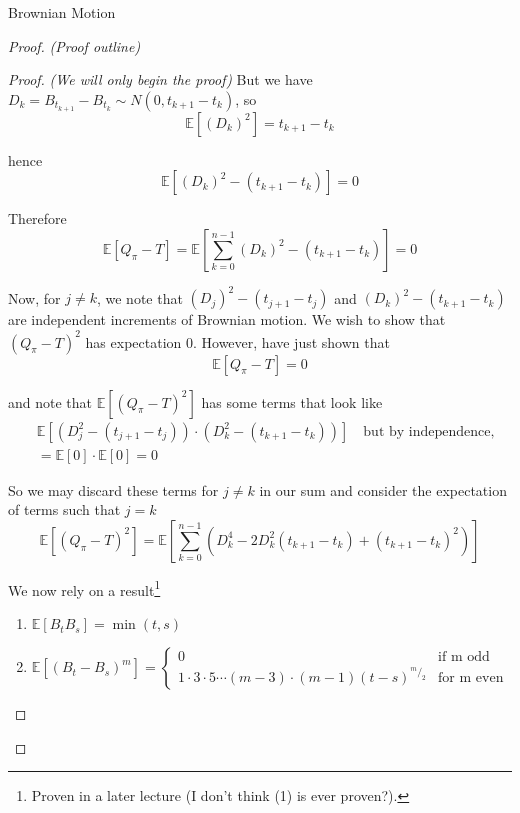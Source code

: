 \documentclass[12pt]{article}
\newenvironment{theorem}[2][Theorem:]{\begin{trivlist} %
\item[\hskip \labelsep {\bfseries #1}\hskip \labelsep {\bfseries #2.}]}{\end{trivlist}}
\newlength\tindent
\renewcommand{\indent}{\hspace*{\tindent}}
\begin{document}
\begin{section}{Brownian Motion}
\begin{theorem}{Brownian motion is continuous everywhere but differentiable nowhere}
\begin{proof} {\em (Proof outline)}
\begin{theorem}{The quadratic variation of a Brownian motion is nonzero}
\begin{proof} {\em (We will only begin the proof)}
But we have $D_k = B_{t_{k + 1}} - B_{t_k} \sim N(0, t_{k + 1} - t_k)$, so
\begin{equation*}
	\mathbb E \left[ \left( D_k \right)^2 \right] = t_{k + 1} - t_k
\end{equation*}

hence
\begin{equation*}
	\mathbb E[\left( D_k \right)^2 - (t_{k+1} - t_k)] = 0
\end{equation*}

Therefore
\begin{equation*}
	\mathbb E \left[ Q_\pi - T \right] = \mathbb E \left[ \sum^{n - 1}_{k = 0} \left( D_k \right)^2 - (t_{k + 1} - t_k) \right] = 0
\end{equation*}

\indent Now, for $j\neq k$, we note that $(D_j)^2 - (t_{j+1} - t_j)$ and $(D_k)^2 - (t_{k+1} - t_k)$ are independent increments of Brownian motion. We wish to show that $(Q_\pi - T)^2$ has expectation 0. However, have just shown that
\begin{equation*}
	\mathbb E[Q_\pi - T] = 0
\end{equation*}

and note that $\mathbb E[(Q_\pi - T)^2]$ has some terms that look like 
\begin{align*}
	&\mathbb E[(D^2_j - (t_{j+1} - t_j)) \cdot (D^2_k - (t_{k+1} - t_k))] \quad \text{but by independence,} \\
	&= \mathbb E[0] \cdot \mathbb E[0] = 0
\end{align*}

\indent So we may discard these terms for $j \neq k$ in our sum and consider the expectation of terms such that $j = k$
\begin{equation*}
	\mathbb E[(Q_\pi - T)^2] = \mathbb E[\sum^{n - 1}_{k = 0}(D^4_k - 2D^2_k(t_{k+1} - t_k) + (t_{k+1} - t_k)^2)] 
\end{equation*}

We now rely on a result\footnote{Proven in a later lecture (I don't think (1) is ever proven?).}
\begin{enumerate}
	\item $\mathbb E[B_t B_s] = \min(t,s)$
	\item $\mathbb E[(B_t-B_s)^m] = 
		\begin{cases}
		0 & \text{if m odd} \\
		1\cdot3\cdot5\cdots(m-3)\cdot(m-1)(t-s)^{^m/_2} & \text{for m even}
		\end{cases}$
\end{enumerate}


\end{proof}
\end{theorem}
\end{proof}
\end{theorem}
\end{section}
\end{document}

